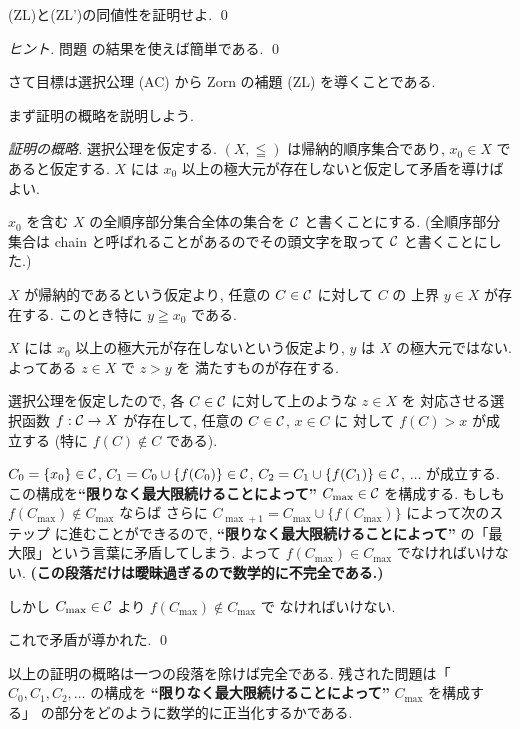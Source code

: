 \documentclass[12pt,twoside]{jarticle}
\begin{document}
\begin{question}[5点]
  (ZL)と(ZL')の同値性を証明せよ. \qed
\end{question}

\begin{proof}[ヒント]
  問題  の結果を使えば簡単である. \qed
\end{proof}

さて目標は選択公理 (AC) から Zorn の補題 (ZL) を導くことである. 

まず証明の概略を説明しよう.

\begin{proof}[証明の概略]
  選択公理を仮定する.
  $(X,\leqq)$ は帰納的順序集合であり, $x_0\in X$ であると仮定する.
  $X$ には $x_0$ 以上の極大元が存在しないと仮定して矛盾を導けばよい.
  
  $x_0$ を含む $X$ の全順序部分集合全体の集合を ${\mathcal C}$ と書くことにする. 
  (全順序部分集合は chain と呼ばれることがあるのでその頭文字を取って ${\mathcal C}$ 
  と書くことにした.)
  
  $X$ が帰納的であるという仮定より, 任意の $C\in {\mathcal C}$ に対して $C$ の
  上界 $y\in X$ が存在する. このとき特に $y\geqq x_0$ である.
  
  $X$ には $x_0$ 以上の極大元が存在しないという仮定より, %
  $y$ は $X$ の極大元ではない. よってある $z\in X$ で $z>y$ を
  満たすものが存在する.
  
  選択公理を仮定したので, 各 $C\in{\mathcal C}$ に対して上のような $z\in X$ を
  対応させる選択函数 $f:{\mathcal C}\to X$ が存在して, 任意の $C\in{\mathcal C}$, $x\in C$ に
  対して $f(C)>x$ が成立する (特に $f(C)\not\in C$ である).
  
  $C_0=\{x_0\}\in{\mathcal C}$, 
  $C_1=C_0\cup\{f(C_0)\}\in{\mathcal C}$, 
  $C_2=C_1\cup\{f(C_1)\}\in{\mathcal C}$, $\ldots$ が成立する.
  この構成を{\bf ``限りなく最大限続けることによって''} $C_{\max}\in {\mathcal C}$ 
  を構成する. 
  もしも $f(C_{\max})\not\in C_{\max}$ ならば
  さらに $C_{\max+1} = C_{\max}\cup\{f(C_{\max})\}$ によって次のステップ
  に進むことができるので, {\bf ``限りなく最大限続けることによって''}
  の「最大限」という言葉に矛盾してしまう.
  よって $f(C_{\max})\in C_{\max}$ でなければいけない.
  {\bf (この段落だけは曖昧過ぎるので数学的に不完全である.)}
  
  しかし $C_{\max}\in{\mathcal C}$ より $f(C_{\max})\not\in C_{\max}$ で
  なければいけない.
  
  これで矛盾が導かれた.
  \qed  
\end{proof}

以上の証明の概略は一つの段落を除けば完全である. 
残された問題は「$C_0,C_1,C_2,\ldots$ の構成を
{\bf ``限りなく最大限続けることによって''} $C_{\max}$ を構成する」
の部分をどのように数学的に正当化するかである.
\end{document}
